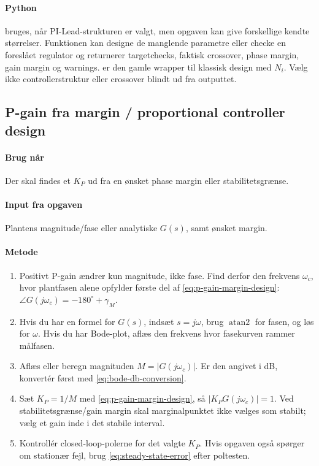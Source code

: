 \paragraph{Python}
bruges, når PI-Lead-strukturen er valgt, men opgaven kan give forskellige kendte
størrelser. Funktionen kan designe de manglende parametre eller checke en foreslået
regulator og returnerer targetchecks, faktisk crossover, phase margin, gain margin og
warnings. 
er den gamle wrapper til klassisk design med \(N_i\). Vælg ikke controllerstruktur eller
crossover blindt ud fra outputtet.

\subsection{P-gain fra margin / proportional controller design}

\paragraph{Brug når}
Der skal findes et \(K_P\) ud fra en ønsket phase margin eller stabilitetsgrænse.

\paragraph{Input fra opgaven}
Plantens magnitude/fase eller analytiske \(G(s)\), samt ønsket margin.

\paragraph{Metode}
\begin{enumerate}
\item Positivt P-gain ændrer kun magnitude, ikke fase. Find derfor den frekvens
      \(\omega_c\), hvor plantfasen alene opfylder første del af
      \eqref{eq:p-gain-margin-design}: \(\angle G(j\omega_c)=-180^\circ+\gamma_M\).
\item Hvis du har en formel for \(G(s)\), indsæt \(s=j\omega\), brug
      \(\operatorname{atan2}\) for fasen, og løs for \(\omega\). Hvis du har Bode-plot,
      aflæs den frekvens hvor fasekurven rammer målfasen.
\item Aflæs eller beregn magnituden \(M=|G(j\omega_c)|\). Er den angivet i dB, konvertér
      først med \eqref{eq:bode-db-conversion}.
\item Sæt \(K_P=1/M\) med \eqref{eq:p-gain-margin-design}, så
      \(|K_PG(j\omega_c)|=1\). Ved stabilitetsgrænse/gain margin skal marginalpunktet
      ikke vælges som stabilt; vælg et gain inde i det stabile interval.
\item Kontrollér closed-loop-polerne for det valgte \(K_P\). Hvis opgaven også spørger
      om stationær fejl, brug \eqref{eq:steady-state-error} efter poltesten.
\end{enumerate}

